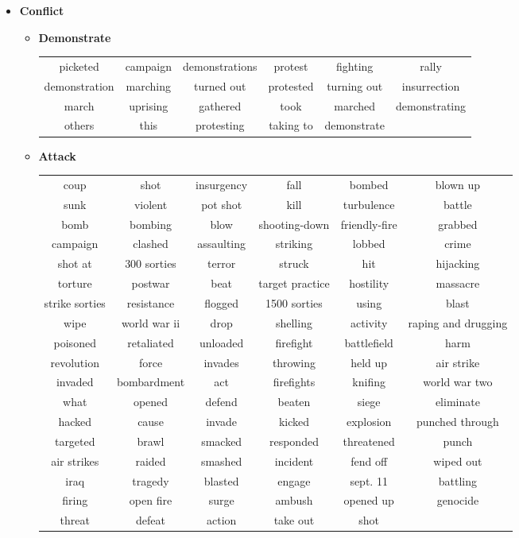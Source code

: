 \documentclass[11pt, oneside]{article}   	%
\begin{document}
\begin{itemize}
\clearpage
\item[] \textbf{Conflict} 
	\vspace*{-0.2cm}
	\begin{itemize}
	\item[] \textbf{Demonstrate} \\
		 \begin{tabular}{ c c c c c c }
		 picketed & campaign & demonstrations & protest & fighting & rally\\demonstration & marching & turned out & protested & turning out & insurrection\\march & uprising & gathered & took & marched & demonstrating\\others & this & protesting & taking to & demonstrate
		\end{tabular}
	\item[] \textbf{Attack} \\
		 \hspace*{-2.0cm}\begin{tabular}{ c c c c c c }
		 coup & shot & insurgency & fall & bombed & blown up\\sunk & violent & pot shot & kill & turbulence & battle\\bomb & bombing & blow & shooting-down & friendly-fire & grabbed\\campaign & clashed & assaulting & striking & lobbed & crime\\shot at & 300 sorties & terror & struck & hit & hijacking\\torture & postwar & beat & target practice & hostility & massacre\\strike sorties & resistance & flogged & 1500 sorties & using & blast\\wipe & world war ii & drop & shelling & activity & raping and drugging\\poisoned & retaliated & unloaded & firefight & battlefield & harm\\revolution & force & invades & throwing & held up & air strike\\invaded & bombardment & act & firefights & knifing & world war two\\what & opened & defend & beaten & siege & eliminate\\hacked & cause & invade & kicked & explosion & punched through\\targeted & brawl & smacked & responded & threatened & punch\\air strikes & raided & smashed & incident & fend off & wiped out\\iraq & tragedy & blasted & engage & sept. 11 & battling\\firing & open fire & surge & ambush & opened up & genocide\\threat & defeat & action & take out & shot

\end{tabular}
\end{itemize}
\end{itemize}
\end{document}
